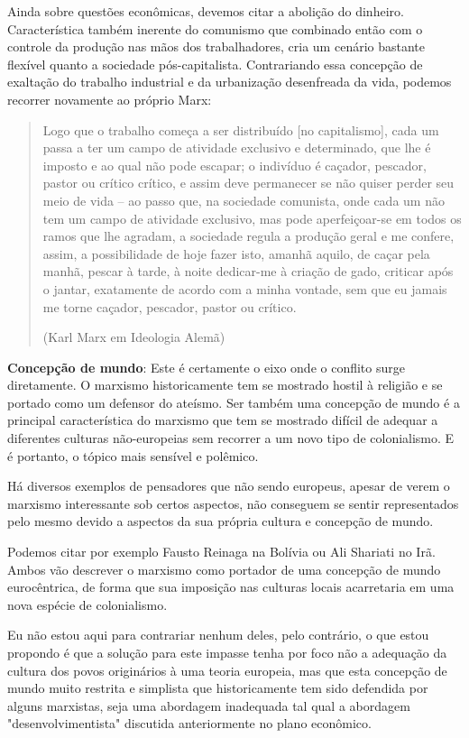 Ainda sobre questões econômicas, devemos citar a abolição do dinheiro. Característica também inerente do comunismo que combinado então com o controle da produção nas mãos dos trabalhadores, cria um cenário bastante flexível quanto a sociedade pós-capitalista. Contrariando essa concepção de exaltação do trabalho industrial e da urbanização desenfreada da vida, podemos recorrer novamente ao próprio Marx:

\begin{quote}
Logo que o trabalho começa a ser distribuído [no capitalismo], cada um passa a ter um campo de atividade exclusivo e determinado, que lhe é imposto e ao qual não pode escapar; o indivíduo é caçador, pescador, pastor ou crítico crítico, e assim deve permanecer se não quiser perder seu meio de vida – ao passo que, na sociedade comunista, onde cada um não tem um campo de atividade exclusivo, mas pode aperfeiçoar-se em todos os ramos que lhe agradam, a sociedade regula a produção geral e me confere, assim, a possibilidade de hoje fazer isto, amanhã aquilo, de caçar pela manhã, pescar à tarde, à noite dedicar-me à criação de gado, criticar após o jantar, exatamente de acordo com a minha vontade, sem que eu jamais me torne caçador, pescador, pastor ou crítico.

(Karl Marx em Ideologia Alemã)
\end{quote}

\textbf{Concepção de mundo}: Este é certamente o eixo onde o conflito surge diretamente. O marxismo historicamente tem se mostrado hostil à religião e se portado como um defensor do ateísmo. Ser também uma concepção de mundo é a principal característica do marxismo que tem se mostrado difícil de adequar a diferentes culturas não-europeias sem recorrer a um novo tipo de colonialismo. E é portanto, o tópico mais sensível e polêmico.

Há diversos exemplos de pensadores que não sendo europeus, apesar de verem o marxismo interessante sob certos aspectos, não conseguem se sentir representados pelo mesmo devido a aspectos da sua própria cultura e concepção de mundo.

Podemos citar por exemplo Fausto Reinaga na Bolívia ou Ali Shariati no Irã. Ambos vão descrever o marxismo como portador de uma concepção de mundo eurocêntrica, de forma que sua imposição nas culturas locais acarretaria em uma nova espécie de colonialismo.

Eu não estou aqui para contrariar nenhum deles, pelo contrário, o que estou propondo é que a solução para este impasse tenha por foco não a adequação da cultura dos povos originários à uma teoria europeia, mas que esta concepção de mundo muito restrita e simplista que historicamente tem sido defendida por alguns marxistas, seja uma abordagem inadequada tal qual a abordagem "desenvolvimentista" discutida anteriormente no plano econômico.

